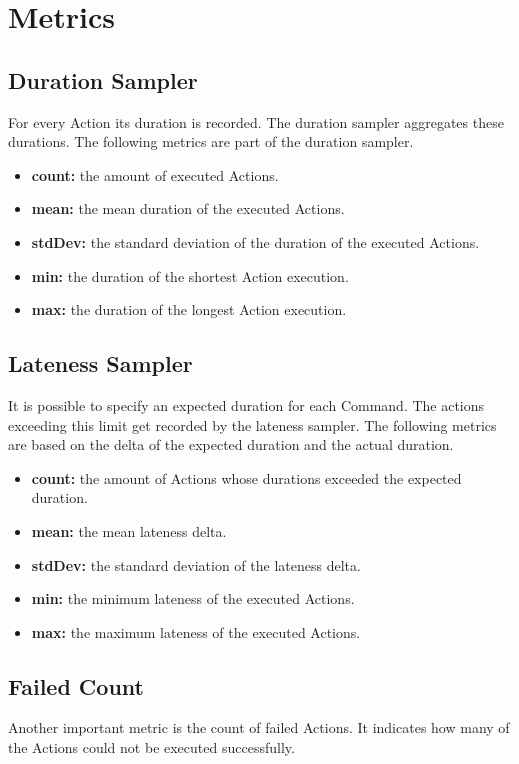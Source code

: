 \section{Metrics}\label{sec:metrics}
\subsection{Duration Sampler}
For every Action its duration is recorded.
The duration sampler aggregates these durations.
The following metrics are part of the duration sampler.
\begin{itemize}
	\item \textbf{count:} the amount of executed Actions.
	\item \textbf{mean:} the mean duration of the executed Actions.
	\item \textbf{stdDev:} the standard deviation of the duration of the executed Actions.
	\item \textbf{min:} the duration of the shortest Action execution.
	\item \textbf{max:} the duration of the longest Action execution.
\end{itemize}
\subsection{Lateness Sampler}
It is possible to specify an expected duration for each Command.
The actions exceeding this limit get recorded by the lateness sampler.
The following metrics are based on the delta of the expected duration and the actual duration.
\begin{itemize}
	\item \textbf{count:} the amount of Actions whose durations exceeded the expected duration.
	\item \textbf{mean:} the mean lateness delta.
	\item \textbf{stdDev:} the standard deviation of the lateness delta.
	\item \textbf{min:} the minimum lateness of the executed Actions.
	\item \textbf{max:} the maximum lateness of the executed Actions.
\end{itemize}

\subsection{Failed Count}
Another important metric is the count of failed Actions.
It indicates how many of the Actions could not be executed successfully.



